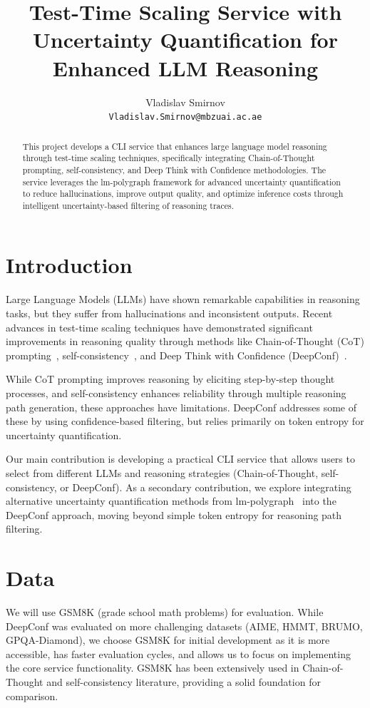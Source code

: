 \documentclass[11pt]{article}
\title{Test-Time Scaling Service with Uncertainty Quantification for Enhanced LLM Reasoning}
\author{Vladislav Smirnov \\
  \texttt{Vladislav.Smirnov@mbzuai.ac.ae} \\
}
\begin{document}
\maketitle
\begin{abstract}
This project develops a CLI service that enhances large language model reasoning through test-time scaling techniques, specifically integrating Chain-of-Thought prompting, self-consistency, and Deep Think with Confidence methodologies. The service leverages the lm-polygraph framework for advanced uncertainty quantification to reduce hallucinations, improve output quality, and optimize inference costs through intelligent uncertainty-based filtering of reasoning traces.
\end{abstract}

\section{Introduction}

Large Language Models (LLMs) have shown remarkable capabilities in reasoning tasks, but they suffer from hallucinations and inconsistent outputs. Recent advances in test-time scaling techniques have demonstrated significant improvements in reasoning quality through methods like Chain-of-Thought (CoT) prompting~\cite{wei2022chain}, self-consistency~\cite{wang2022self}, and Deep Think with Confidence (DeepConf)~\cite{sun2025deep}.

While CoT prompting improves reasoning by eliciting step-by-step thought processes, and self-consistency enhances reliability through multiple reasoning path generation, these approaches have limitations. DeepConf addresses some of these by using confidence-based filtering, but relies primarily on token entropy for uncertainty quantification.

Our main contribution is developing a practical CLI service that allows users to select from different LLMs and reasoning strategies (Chain-of-Thought, self-consistency, or DeepConf). As a secondary contribution, we explore integrating alternative uncertainty quantification methods from lm-polygraph~\cite{shelmanov2024benchmarking} into the DeepConf approach, moving beyond simple token entropy for reasoning path filtering.

\section{Data}

We will use GSM8K (grade school math problems) for evaluation. While DeepConf was evaluated on more challenging datasets (AIME, HMMT, BRUMO, GPQA-Diamond), we choose GSM8K for initial development as it is more accessible, has faster evaluation cycles, and allows us to focus on implementing the core service functionality. GSM8K has been extensively used in Chain-of-Thought and self-consistency literature, providing a solid foundation for comparison.
\end{document}
